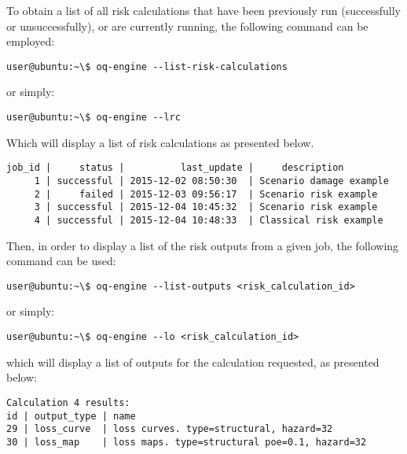 To obtain a list of all risk calculations that have been previously run
(successfully or unsuccessfully), or are currently running, the following
command can be employed:

\begin{verbatim}
user@ubuntu:~\$ oq-engine --list-risk-calculations
\end{verbatim}

or simply:

\begin{verbatim}
user@ubuntu:~\$ oq-engine --lrc
\end{verbatim}

Which will display a list of risk calculations as presented below.

\begin{verbatim}
job_id |     status |          last_update |     description
     1 | successful | 2015-12-02 08:50:30  | Scenario damage example
     2 |     failed | 2015-12-03 09:56:17  | Scenario risk example
     3 | successful | 2015-12-04 10:45:32  | Scenario risk example
     4 | successful | 2015-12-04 10:48:33  | Classical risk example
\end{verbatim}

Then, in order to display a list of the risk outputs from a given job, the
following command can be used:

\begin{verbatim}
user@ubuntu:~\$ oq-engine --list-outputs <risk_calculation_id>
\end{verbatim}

or simply:

\begin{verbatim}
user@ubuntu:~\$ oq-engine --lo <risk_calculation_id>
\end{verbatim}

which will display a list of outputs for the calculation requested, as
presented below:

\begin{verbatim}
Calculation 4 results:
id | output_type | name
29 | loss_curve  | loss curves. type=structural, hazard=32
30 | loss_map    | loss maps. type=structural poe=0.1, hazard=32
\end{verbatim}

